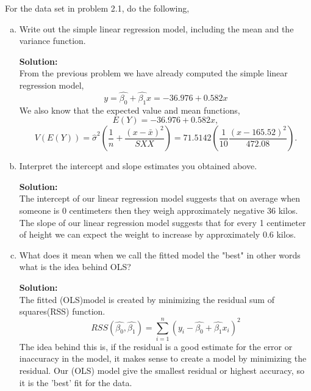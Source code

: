 \documentclass[12pt]{article}
\makeatletter
\theoremstyle{homework}
\newenvironment{exercise}[1]
{\def\@currentlabel{#1}\exercisecore}
{\endexercisecore}
\newcommand{\localhead}[1]{\par\smallskip\noindent\textbf{#1}\nobreak\\}%
\newcommand\solution{\localhead{Solution:}}
\makeatother
\begin{document}
\begin{exercise}{2} For the data set in problem 2.1, do the following, 
  \begin{enumerate}[a.]
    \item Write out the simple linear regression model, including the mean and the variance function.\\
    \solution From the previous problem we have already computed the simple linear regression model, 
    \begin{equation*}
      y = \hat{\beta_0} + \hat{\beta_1}x = -36.976 +  0.582x
    \end{equation*}
    We also know that the expected value and mean functions, 
    \begin{equation*}
      E(Y) = -36.976 +  0.582x,
    \end{equation*}
    \begin{equation*}
      V(E(Y)) =  \hat{\sigma}^2 \left(\frac{1}{n} + \frac{(x - \bar{x})^2}{SXX}\right) = 71.5142 \left(\frac{1}{10} \frac{(x - 165.52)^2}{472.08}\right).
    \end{equation*}
    \vspace{.15in}

    \item Interpret the intercept and slope estimates you obtained above.\\
    \solution The intercept of our linear regression model suggests that on average when someone is 
    0 centimeters then they weigh approximately negative 36 kilos. The slope of our linear regression model
    suggests that for every 1 centimeter of height we can expect the weight to increase by approximately 0.6 kilos. 
    \vspace{.15in}

    \item What does it mean when we call the fitted model the "best" in other words what is the idea behind OLS?\\
    \solution The fitted (OLS)model is created by minimizing the residual sum of squares(RSS) function. 
    \begin{equation*}
      RSS(\hat{\beta_0}, \hat{\beta_1}) = \sum_{i = 1}^n (y_i - \hat{\beta_0} + \hat{\beta_1}x_i)^2
    \end{equation*}
    The idea behind this is, if the residual is a good estimate for the error or inaccuracy in the model, it makes sense to 
    create a model by minimizing the residual. Our (OLS) model give the smallest residual or highest accuracy, so it is the 'best' fit for the 
    data. 
    \vspace{.15in}


\end{enumerate}
\end{exercise}
\end{document}
